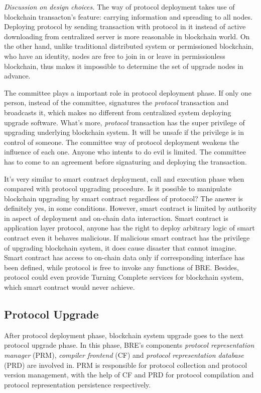 \documentclass[sigplan,screen]{acmart}
\begin{document}
\textit{Discussion on design choices.} The way of protocol deployment takes use
of blockchain transacton's feature: carrying information and spreading to all
nodes. Deploying protocol by sending transaction with protocol in it instead of
active downloading from centralized server is more reasonable in blockchain
world. On the other hand, unlike traditional distributed system or permissioned
blockchain, who have an identity, nodes are free to join in or leave in
permissionless blockchain, thus makes it impossible to determine the set of
upgrade nodes in advance.

The committee plays a important role in protocol deployment phase. If only one
person, instead of the committee, signatures the \textit{protocol} transaction
and broadcasts it, which makes no different from centralized system deploying
upgrade software. What's more, \textit{protocol} transaction has the super
privilege of upgrading underlying blockchain system. It will be unsafe if the
privilege is in control of someone. The committee way of protocol deployment
weakens the influence of each one. Anyone who intents to do evil is limited.
The committee has to come to an agreement before signaturing and deploying the
transaction.

It's very similar to smart contract
deployment, call and execution phase when compared with protocol upgrading
procedure. Is it possible to manipulate blockchain upgrading by smart contract
regardless of protocol? The answer is definitely yes, in some conditions.
However, smart contract is limited by authority in aspect of deployment and
on-chain data interaction. Smart contract is application layer protocol,
anyone has the right to deploy arbitrary logic of smart contract even
it behaves malicious. If malicious smart contract has the privilege of
upgrading blockchain system, it does cause disaster that cannot imagine.
Smart contract has access to on-chain data only if corresponding
interface has been defined,
while protocol is free to invoke any functions of BRE. Besides,
protocol could even provide Turning Complete services for blockchain system,
which smart contract would never achieve.


\subsection{Protocol Upgrade}
After protocol deployment phase, blockchain system upgrade goes to the next
protocol upgrade phase. In this phase, BRE's components \textit{protocol
  representation manager} (PRM), \textit{compiler frontend} (CF) and
\textit{protocol representation database} (PRD) are involved in. PRM is responsible
for protocol collection and protocol version management, with the help of CF
and PRD for protocol compilation and protocol representation persistence
respectively.
\end{document}
